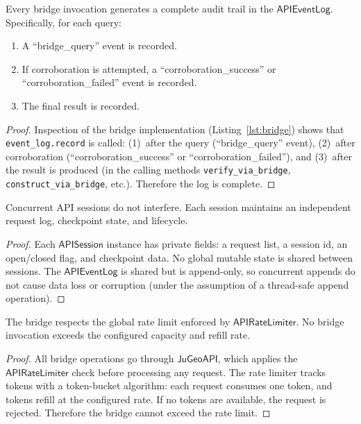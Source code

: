 \documentclass[11pt]{article}
\newcommand{\JuGeoAPI}{\mathsf{JuGeoAPI}}
\newcommand{\APISess}{\mathsf{APISession}}
\newcommand{\APILog}{\mathsf{APIEventLog}}
\newcommand{\APIRate}{\mathsf{APIRateLimiter}}
\begin{document}
\begin{theorem}\label{thm:logcomp}
Every bridge invocation generates a complete audit trail
in the $\APILog$.  Specifically, for each query:
\begin{enumerate}
\item A ``bridge\_query'' event is recorded.
\item If corroboration is attempted, a
      ``corroboration\_success'' or ``corroboration\_failed''
      event is recorded.
\item The final result is recorded.
\end{enumerate}
\end{theorem}
\begin{proof}
Inspection of the bridge implementation
(Listing~\ref{lst:bridge}) shows that
\texttt{event\_log.record} is called:
(1)~after the query (``bridge\_query'' event),
(2)~after corroboration (``corroboration\_success'' or
``corroboration\_failed''), and
(3)~after the result is produced (in the calling methods
\texttt{verify\_via\_bridge}, \texttt{construct\_via\_bridge},
etc.).  Therefore the log is complete.
\end{proof}

\begin{theorem}\label{thm:sessiso}
Concurrent API sessions do not interfere.  Each session
maintains an independent request log, checkpoint state,
and lifecycle.
\end{theorem}
\begin{proof}
Each $\APISess$ instance has private fields: a request
list, a session id, an open/closed flag, and checkpoint
data.  No global mutable state is shared between sessions.
The $\APILog$ is shared but is append-only, so concurrent
appends do not cause data loss or corruption (under the
assumption of a thread-safe append operation).
\end{proof}

\begin{theorem}\label{thm:ratelimit}
The bridge respects the global rate limit enforced by
$\APIRate$.  No bridge invocation exceeds the configured
capacity and refill rate.
\end{theorem}
\begin{proof}
All bridge operations go through $\JuGeoAPI$, which
applies the $\APIRate$ check before processing any request.
The rate limiter tracks tokens with a token-bucket algorithm:
each request consumes one token, and tokens refill at the
configured rate.  If no tokens are available, the request
is rejected.  Therefore the bridge cannot exceed the rate
limit.
\end{proof}
\end{document}
